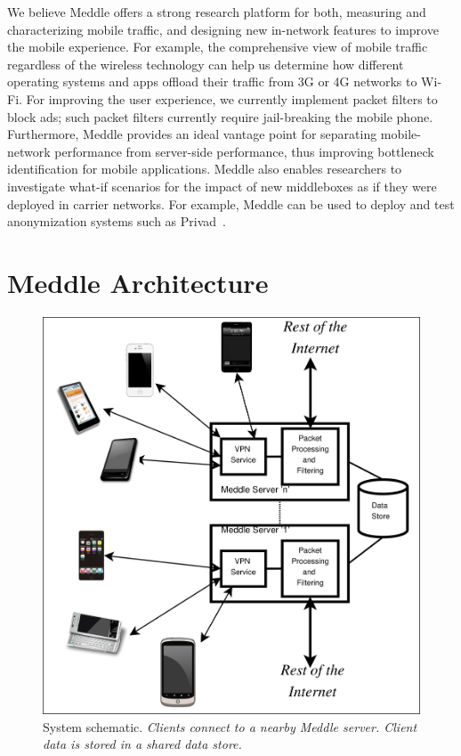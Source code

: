 \documentclass{sig-alternate-10pt}
\newcommand{\meddle}{{Meddle}\xspace}
\begin{document}
We believe \meddle offers a strong research platform for both,
measuring and characterizing mobile traffic, and designing new
in-network features to improve the mobile experience. For example, the
comprehensive view of mobile traffic regardless of the wireless
technology can help us determine how different operating systems and
apps offload their traffic from 3G or 4G networks to Wi-Fi. For
improving the user experience, we currently implement packet filters
to block ads; such packet filters currently require
jail-breaking the mobile phone. Furthermore, Meddle provides an ideal
vantage point for separating mobile-network performance from
server-side performance, thus improving bottleneck identification for
mobile applications. \meddle also enables researchers to investigate
what-if scenarios for the impact of new middleboxes as if they were
deployed in carrier networks. For example, \meddle can be used to
deploy and test anonymization systems such as
Privad~\cite{guha:privad}.

\section{\meddle Architecture}

\begin{figure}
  \centering
  \includegraphics[width=0.65\columnwidth]{figures/meddle-servers.pdf}
  \caption{System schematic. \emph{Clients connect to a nearby \meddle
      server. Client data is stored in a shared data store.}} 
  \label{fig:MeddleDeployment}
\vspace{-0.08in}
\end{figure}
\end{document}
